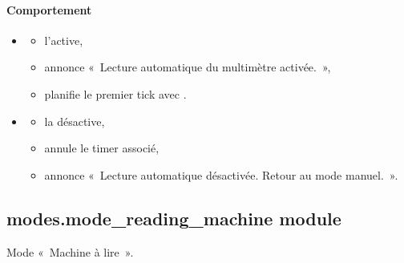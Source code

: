 \documentclass[letterpaper,10pt,french]{sphinxmanual}
\begin{document}
\begin{fulllineitems}
\begin{fulllineitems}
\paragraph{Comportement}
\label{\detokenize{api/modes:id8}}\begin{itemize}
\item {} \begin{description}
\begin{itemize}
\item {} 
\sphinxAtStartPar
l’active,

\item {} 
\sphinxAtStartPar
annonce « Lecture automatique du multimètre activée. »,

\item {} 
\sphinxAtStartPar
planifie le premier tick avec .

\end{itemize}

\end{description}

\item {} \begin{description}
\begin{itemize}
\item {} 
\sphinxAtStartPar
la désactive,

\item {} 
\sphinxAtStartPar
annule le timer associé,

\item {} 
\sphinxAtStartPar
annonce « Lecture automatique désactivée. Retour au mode manuel. ».

\end{itemize}

\end{description}

\end{itemize}

\end{fulllineitems}


\end{fulllineitems}



\subsection{modes.mode\_reading\_machine module}
\label{\detokenize{api/modes:module-modes.mode_reading_machine}}\label{\detokenize{api/modes:modes-mode-reading-machine-module}}
\sphinxAtStartPar
Mode « Machine à lire ».
\end{document}
